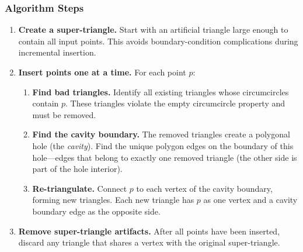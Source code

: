 \subsubsection*{Algorithm Steps}

\begin{enumerate}
    \item \textbf{Create a super-triangle.} Start with an artificial triangle
    large enough to contain all input points.  This avoids boundary-condition
    complications during incremental insertion.
    \item \textbf{Insert points one at a time.} For each point $p$:
    \begin{enumerate}
        \item \textbf{Find bad triangles.} Identify all existing triangles
        whose circumcircles contain $p$.  These triangles violate the empty
        circumcircle property and must be removed.
        \item \textbf{Find the cavity boundary.} The removed triangles create
        a polygonal hole (the \emph{cavity}).  Find the unique polygon edges
        on the boundary of this hole---edges that belong to exactly one removed
        triangle (the other side is part of the hole interior).
        \item \textbf{Re-triangulate.} Connect $p$ to each vertex of the
        cavity boundary, forming new triangles.  Each new triangle has $p$ as
        one vertex and a cavity boundary edge as the opposite side.
    \end{enumerate}
    \item \textbf{Remove super-triangle artifacts.} After all points have been
    inserted, discard any triangle that shares a vertex with the original
    super-triangle.
\end{enumerate}

